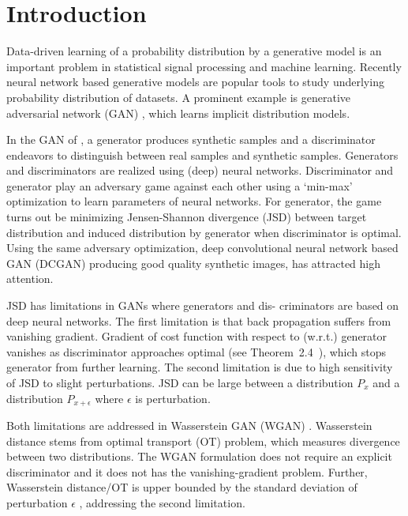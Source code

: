 \section{Introduction}

Data-driven learning of a probability distribution by a generative model is an important problem 
in statistical signal processing and machine learning. 
Recently neural network based generative models are popular tools to
study underlying probability distribution of datasets. A prominent example is 
generative adversarial network (GAN) \cite{NIPS2014_5423}, which learns 
implicit distribution models. 

In the GAN of \cite{NIPS2014_5423}, a generator produces
synthetic samples and a discriminator endeavors to
distinguish between real samples and synthetic samples. Generators and discriminators are realized using (deep) neural networks.
Discriminator and generator
play an adversary game against each other using a `min-max' optimization to learn parameters of neural networks. 
For generator, the game
turns out be minimizing Jensen-Shannon divergence (JSD) between
target distribution and induced distribution by generator when discriminator is
optimal. Using the same adversary
optimization, deep convolutional neural network based GAN (DCGAN)
\cite{2015arXiv151106434R} producing good quality synthetic images, has attracted high attention.

JSD has limitations in GANs where generators and dis-
criminators are based on deep neural networks. The first limitation is that back
propagation suffers from vanishing gradient. Gradient of cost
function with respect to (w.r.t.) generator vanishes as
discriminator approaches optimal (see Theorem~2.4~\cite{2017arXiv170104862A}),
which stops generator from further learning. The second limitation is due to high sensitivity of JSD to slight perturbations. JSD can be large between a distribution $P_x$ and a distribution $P_{x+\epsilon}$ where $\epsilon$ is perturbation\cite{2017arXiv170104862A}. 

Both limitations are addressed in Wasserstein GAN (WGAN)
\cite{2017arXiv170107875A}. Wasserstein distance stems from
optimal transport (OT) problem, which measures divergence between two
distributions. The WGAN formulation does not require an explicit
discriminator and it does not has the vanishing-gradient problem. Further,
Wasserstein distance/OT is upper bounded by the standard deviation of perturbation $\epsilon$
\cite{2017arXiv170104862A}, addressing the second limitation. 


